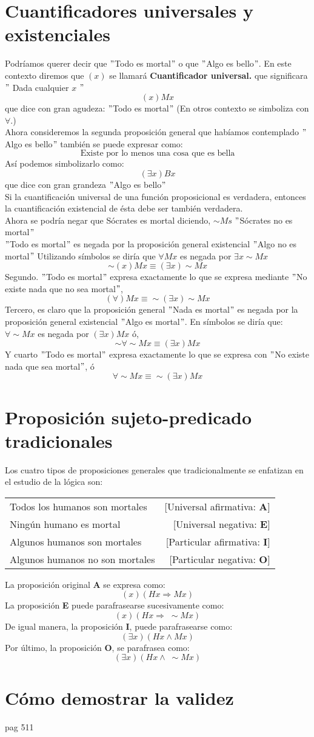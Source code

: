 \documentclass[10pt]{book} 						%
\begin{document}
\section{Cuantificadores universales y existenciales}
Podríamos querer decir que $"$Todo es mortal$"$ o que $"$Algo es bello$"$. En este contexto diremos que $(x)$ se llamará \textbf{Cuantificador universal.} que significara $"$ Dada cualquier $x$ $"$
$$(x) Mx$$ que dice con gran agudeza: $"$Todo es mortal$"$ (En otros contexto se simboliza con $\forall$.)\\
 Ahora consideremos la segunda proposición general que habíamos contemplado $"$Algo es bello$"$ también se puede expresar como: 
 $$\mbox{Existe por lo menos una cosa que es bella}$$
Así podemos simbolizarlo como: $$(\exists x) Bx$$
que dice con gran grandeza $"$Algo es bello$"$\\
Si la cuantificación universal de una función proposicional es verdadera, entonces la cuantificación existencial de ésta debe ser también verdadera.\\
Ahora se podría negar que Sócrates es mortal diciendo, $\sim Ms$ $"$Sócrates no es mortal$"$\\
$"$Todo es mortal$"$ es negada por la proposición general existencial $"$Algo no es mortal$"$ Utilizando símbolos se diría que $\forall Mx$ es negada por $\exists x \sim Mx$
$$\sim (x) Mx \equiv (\exists x) \sim Mx$$
Segundo. $"$Todo es mortal$"$ expresa exactamente lo que se expresa mediante $"$No existe nada que no sea mortal$"$, $$(\forall)Mx \equiv \sim (\exists x)\sim Mx $$
Tercero, es claro que la proposición general $"$Nada es mortal$"$ es negada por la proposición general existencial $"$Algo es mortal$"$. En símbolos se diría que: $\forall \sim Mx$ es negada por $(\exists x) Mx$ ó,  $$\sim \forall \sim Mx \equiv (\exists x) Mx$$
Y cuarto $"$Todo es mortal$"$ expresa exactamente lo que se expresa con $"$No existe nada que sea mortal$"$, ó $$\forall \sim Mx \equiv \sim (\exists x) Mx$$
\section{Proposición sujeto-predicado tradicionales}
Los cuatro tipos de proposiciones generales que tradicionalmente se enfatizan en el estudio de la lógica son:
\begin{center}
\begin{tabular}{l r}
Todos los humanos son mortales&[Universal afirmativa: \textbf{A}]\\
Ningún humano es mortal&[Universal negativa: \textbf{E}]\\
Algunos humanos son mortales&[Particular afirmativa: \textbf{I}]\\
Algunos humanos no son mortales&[Particular negativa: \textbf{O}]\\
\end{tabular}
\end{center}
La proposición original \textbf{A} se expresa como:
$$(x)(Hx \Rightarrow Mx)$$
La proposición \textbf{E} puede parafrasearse sucesivamente como:
$$(x)(Hx \Rightarrow \;  \sim Mx)$$
De igual manera, la proposición \textbf{I}, puede parafrasearse como:
$$(\exists x)(Hx \land Mx)$$
Por último, la proposición \textbf{O}, se parafrasea como: $$(\exists x)(Hx \land \; \sim Mx)$$
\section{Cómo demostrar la validez}
pag 511
\end{document}
